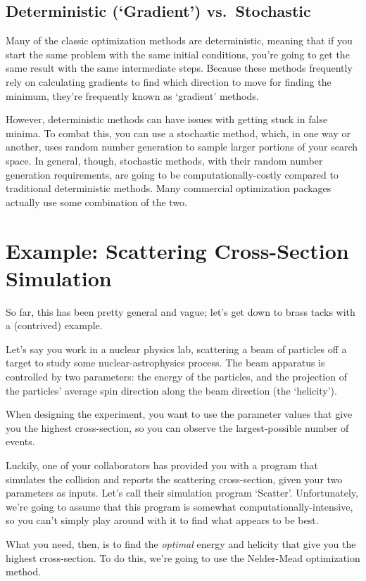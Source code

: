 \documentclass{article}
\begin{document}
  \subsection*{Deterministic (`Gradient') vs.\ Stochastic}
		Many of the classic optimization methods are deterministic,
		meaning that if you start the same problem with the same initial
		conditions, you're going to get the same result with the same
		intermediate steps. Because these methods frequently rely
		on calculating gradients to find which direction to move
		for finding the minimum, they're frequently known as `gradient'
		methods. 

		However, deterministic methods can have issues with getting stuck
		in false minima. To combat this, you can use a stochastic method,
		which, in one way or another, uses random number generation to sample larger
		portions of your search space. In general, though, stochastic methods,
		with their random number generation requirements, are going to 
		be computationally-costly compared to traditional deterministic
		methods. Many commercial optimization packages actually use some
		combination of the two.

\section*{Example: Scattering Cross-Section Simulation}
	So far, this has been pretty general and vague; let's get down
	to brass tacks with a (contrived) example. 

	Let's say you work in a nuclear physics lab, scattering a beam
	of particles off a target to study some nuclear-astrophysics process.
	The beam apparatus is controlled by two parameters: the energy of
	the particles, and the projection of the particles' average spin direction along
	the beam direction (the `helicity'). 

	When designing the experiment, you want to use 
	the parameter values that give you the highest 
	cross-section, so you can observe the largest-possible
	number of events.

	Luckily, one of your collaborators has provided you with a program that simulates
	the collision and reports the scattering cross-section, given your two
	parameters as inputs. Let's call their simulation program `Scatter'.
	Unfortunately, we're going to assume 
	that this program is somewhat computationally-intensive,
	so you can't simply play around with it to find what appears
	to be best.

	What you need, then, is to find the \emph{optimal} energy and helicity
	that give you the highest cross-section. To do this, we're going to use
	the Nelder-Mead optimization method.
\end{document}
